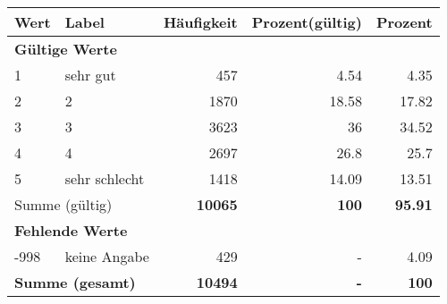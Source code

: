      \begin{longtable}{lXrrr}
     \toprule
     \textbf{Wert} & \textbf{Label} & \textbf{Häufigkeit} & \textbf{Prozent(gültig)} & \textbf{Prozent} \\
     \endhead
     \midrule
     \multicolumn{5}{l}{\textbf{Gültige Werte}}\\

     1 &
     \multicolumn{1}{X}{ sehr gut   } &


       \num{457} &
       \num[round-mode=places,round-precision=2]{4.54} &
         \num[round-mode=places,round-precision=2]{4.35} \\

     2 &
     \multicolumn{1}{X}{ 2   } &


       \num{1870} &
       \num[round-mode=places,round-precision=2]{18.58} &
         \num[round-mode=places,round-precision=2]{17.82} \\

     3 &
     \multicolumn{1}{X}{ 3   } &


       \num{3623} &
       \num[round-mode=places,round-precision=2]{36} &
         \num[round-mode=places,round-precision=2]{34.52} \\

     4 &
     \multicolumn{1}{X}{ 4   } &


       \num{2697} &
       \num[round-mode=places,round-precision=2]{26.8} &
         \num[round-mode=places,round-precision=2]{25.7} \\

     5 &
     \multicolumn{1}{X}{ sehr schlecht   } &


       \num{1418} &
       \num[round-mode=places,round-precision=2]{14.09} &
         \num[round-mode=places,round-precision=2]{13.51} \\
     \midrule
     \multicolumn{2}{l}{Summe (gültig)} &
       \textbf{\num{10065}} &
     \textbf{\num{100}} &
       \textbf{\num[round-mode=places,round-precision=2]{95.91}} \\
     \multicolumn{5}{l}{\textbf{Fehlende Werte}}\\
       -998 &
       keine Angabe &
         \num{429} &
        - &
         \num[round-mode=places,round-precision=2]{4.09} \\
     \midrule
     \multicolumn{2}{l}{\textbf{Summe (gesamt)}} &
          \textbf{\num{10494}} &
        \textbf{-} &
        \textbf{\num{100}} \\
     \bottomrule
     \end{longtable}
     
